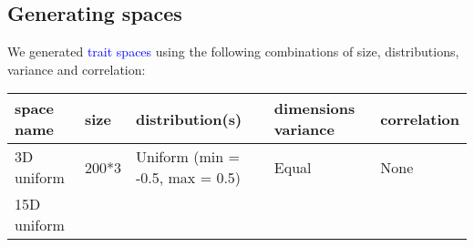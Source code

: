 \documentclass[]{article}
\begin{document}
\subsection{Generating spaces}\label{generating-spaces}

We generated \textcolor{blue}{trait spaces} using the
following combinations of size, distributions, variance and correlation:

\renewcommand\baselinestretch{1}\selectfont

\begin{longtable}[]{@{}lllll@{}}
\toprule
\begin{minipage}[b]{0.12\columnwidth}\raggedright\strut
space name\strut
\end{minipage} & \begin{minipage}[b]{0.12333\columnwidth}\raggedright\strut
size\strut
\end{minipage} & \begin{minipage}[b]{0.31\columnwidth}\raggedright\strut
distribution(s)\strut
\end{minipage} & \begin{minipage}[b]{0.21\columnwidth}\raggedright\strut
dimensions variance\strut
\end{minipage} & \begin{minipage}[b]{0.13\columnwidth}\raggedright\strut
correlation\strut
\end{minipage}\tabularnewline
\midrule
\endhead
\begin{minipage}[t]{0.12\columnwidth}\raggedright\strut
3D uniform\strut
\end{minipage} & \begin{minipage}[t]{0.12333\columnwidth}\raggedright\strut
200*3\strut
\end{minipage} & \begin{minipage}[t]{0.31\columnwidth}\raggedright\strut
Uniform (min = -0.5, max = 0.5)\strut
\end{minipage} & \begin{minipage}[t]{0.21\columnwidth}\raggedright\strut
Equal\strut
\end{minipage} & \begin{minipage}[t]{0.13\columnwidth}\raggedright\strut
None\strut
\end{minipage}\tabularnewline
\begin{minipage}[t]{0.12\columnwidth}\raggedright\strut
15D uniform\strut
\end{minipage} & \begin{minipage}[t]{0.12333\columnwidth}\raggedright\strut

\end{minipage}
\end{longtable}
\end{document}
